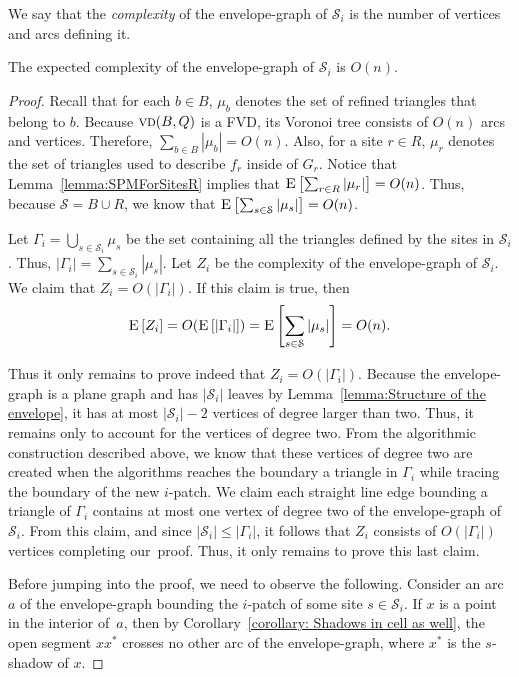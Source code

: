 \documentclass[a4paper,UKenglish]{socg-lipics-v2018}
\newcommand{\icell}[1][i]{${#1}$-patch\xspace}
\newcommand{\s}{\mathcal S}
\newcommand{\vd}[2][P]{\textsc{vd}(#2, #1)}
\newcommand{\ex}[1]{\textsc{E}\left[#1\right]}
\begin{document}
We say that the \emph{complexity} of the envelope-graph of $\s_i$ is the number of vertices and arcs defining it.

\begin{lemma}\label{lemma: Complexity of envelope-graph}
The expected complexity of the envelope-graph of $\s_i$ is $O(n)$.
\end{lemma}
\begin{proof}
Recall that for each $b\in B$, $\mu_b$ denotes the set of refined triangles that belong to $b$. 
Because $\vd[Q]{B}$ is a FVD, its Voronoi tree consists of $O(n)$ arcs and vertices.
Therefore, $\sum_{b\in B} |\mu_b| = O(n)$.
Also, for a site $r\in R$, $\mu_r$ denotes the set of triangles used to describe $f_r$ inside of $G_r$.
Notice that Lemma~\ref{lemma:SPMForSitesR} implies that  $\ex{\sum_{r\in R} |\mu_r|}= O(n)$.
Thus, because $\s = B\cup R$, we know that  $\ex{\sum_{s\in \s} |\mu_s|} = O(n)$.

Let $\Gamma_i = \bigcup_{s\in \s_i} \mu_s$ be the set containing all the triangles defined by the sites in $\s_i$.
Thus, $|\Gamma_i| = \sum_{s\in \s_i}|\mu_s|$.
Let $Z_i$ be the complexity of the envelope-graph of $\s_i$. 
We claim that $Z_i= O(|\Gamma_i|)$. If this claim is true, then 
\[ \ex{Z_i} = O(\ex{|\Gamma_i|})= \ex{\sum_{s\in \s} |\mu_s|} = O(n). \]

Thus it only remains to prove indeed that $Z_i= O(|\Gamma_i|)$.
Because the envelope-graph is a plane graph and has $|\s_i|$ leaves by Lemma~\ref{lemma:Structure of the envelope}, it has at most $|\s_i| - 2$ vertices of degree larger than two.
Thus, it remains only to account for the vertices of degree two.
From the algorithmic construction described above,
we know that these vertices of degree two are created when the algorithms reaches the boundary a triangle in $\Gamma_i$ while tracing the boundary of the new \icell. 
We claim each straight line edge bounding a triangle of $\Gamma_i$ contains at most one vertex of degree two of the envelope-graph of $\s_i$.
From this claim, and since $|\s_i|\leq |\Gamma_i|$, it follows that  $Z_i$ consists of $O(|\Gamma_i|)$ vertices completing our~proof.
Thus, it only remains to prove this last claim.

Before jumping into the proof, we need to observe the following.
Consider an arc $a$ of the envelope-graph bounding the \icell of some site $s\in \s_i$.
If $x$ is a point in the interior of~$a$, then by Corollary~\ref{corollary: Shadows in cell as well}, 
the open segment $x x^*$ crosses no other arc of the envelope-graph, where $x^*$ is the $s$-shadow of $x$.


\end{proof}
\end{document}

